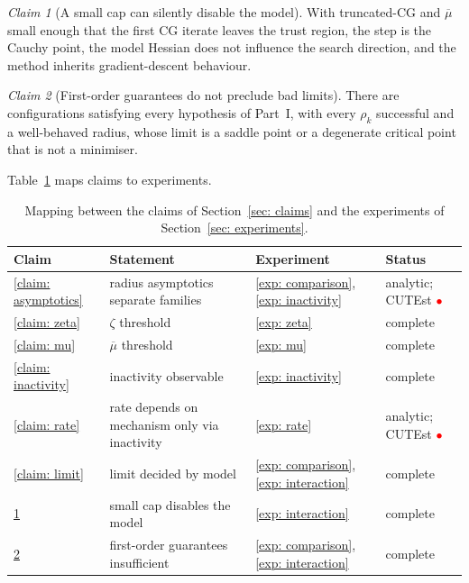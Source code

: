 \documentclass[11pt]{article}
\theoremstyle{plain}
\theoremstyle{definition}
\theoremstyle{remark}
\newtheorem{claimP}{Claim}
\numberwithin{equation}{section}
\newcommand{\placeholder}{\textcolor{red}{$\bullet$}}
\begin{document}
\begin{claimP}[A small cap can silently disable the model]
\label{claim: cauchy}
With truncated-CG and $\overline{\mu}$ small enough that the first CG iterate leaves the trust
region, the step is the Cauchy point, the model Hessian does not influence the search direction,
and the method inherits gradient-descent behaviour.
\end{claimP}

\begin{claimP}[First-order guarantees do not preclude bad limits]
\label{claim: bad limits}
There are configurations satisfying every hypothesis of Part~I, with every $\rho_k$ successful
and a well-behaved radius, whose limit is a saddle point or a degenerate critical point that is
not a minimiser.
\end{claimP}

Table~\ref{tab: claims map} maps claims to experiments.

\begin{table}[htbp]
  \centering
  \caption{Mapping between the claims of Section~\ref{sec: claims} and the experiments of
           Section~\ref{sec: experiments}.}
  \label{tab: claims map}
  \small
  \begin{tabular}{llll}
    \toprule
    Claim & Statement & Experiment & Status \\
    \midrule
    \ref{claim: asymptotics} & radius asymptotics separate families
      & \ref{exp: comparison}, \ref{exp: inactivity} & analytic; CUTEst \placeholder \\
    \ref{claim: zeta} & $\zeta$ threshold
      & \ref{exp: zeta} & complete \\
    \ref{claim: mu} & $\overline{\mu}$ threshold
      & \ref{exp: mu} & complete \\
    \ref{claim: inactivity} & inactivity observable
      & \ref{exp: inactivity} & complete \\
    \ref{claim: rate} & rate depends on mechanism only via inactivity
      & \ref{exp: rate} & analytic; CUTEst \placeholder \\
    \ref{claim: limit} & limit decided by model
      & \ref{exp: comparison}, \ref{exp: interaction} & complete \\
    \ref{claim: cauchy} & small cap disables the model
      & \ref{exp: interaction} & complete \\
    \ref{claim: bad limits} & first-order guarantees insufficient
      & \ref{exp: comparison}, \ref{exp: interaction} & complete \\
    \bottomrule
  \end{tabular}
\end{table}
\end{document}
